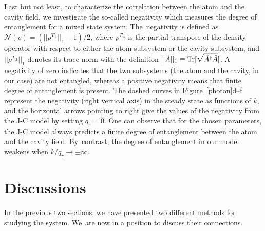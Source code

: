 \documentclass[atoms,article,accept,moreauthors,pdftex,12pt,a4paper]{mdpi}
\begin{document}
Last but not least, to characterize the correlation between the atom and the cavity field, we investigate the so-called negativity \cite{negativity} which measures the degree of entanglement for a mixed state system.
The~negativity is defined as $\mathcal{N}(\rho)=(||\rho^{T_A}||_1-1)/2$, where $\rho^{T_A}$ is the partial transpose of the density operator with respect to either the atom subsystem or the cavity subsystem, and $||\rho^{T_A}||_1$ denotes its trace norm with the definition $||\hat{A}||_1 \equiv {\rm Tr}[\sqrt{\hat{A}^\dag \hat{A}} ]$. A negativity of zero indicates that the two subsystems (the atom and the cavity, in our case) are not entangled, whereas a positive negativity means that finite degree of entanglement is present. The dashed curves in Figure~\ref{photon}d--f represent the negativity (right vertical axis) in the steady state as functions of $k$, and the horizontal arrows pointing to right give the values of the negativity from the J-C model by setting $q_r=0$. One can observe that for the chosen parameters, the J-C model always predicts a finite degree of entanglement between the atom and the cavity field. By~contrast, the degree of entanglement in our model weakens when $k/q_r \rightarrow \pm \infty$.



\section{Discussions} \label{relation}

In the previous two sections, we have presented two different methods for studying the system. We~are now in a position to discuss their connections.
\end{document}
